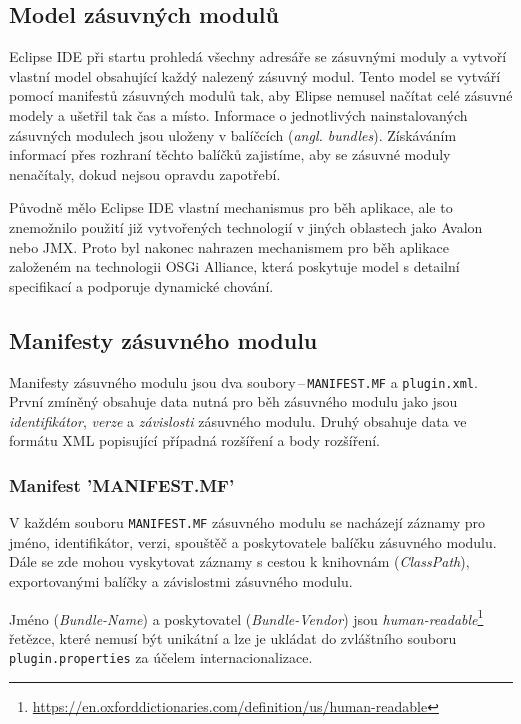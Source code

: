     \subsection{Model zásuvných modulů}
    Eclipse IDE při startu prohledá všechny adresáře se zásuvnými moduly a vytvoří vlastní model obsahující každý nalezený zásuvný modul. Tento model se vytváří pomocí manifestů zásuvných modulů tak, aby Elipse nemusel načítat celé zásuvné modely a ušetřil tak čas a místo. Informace o jednotlivých nainstalovaných zásuvných modulech jsou uloženy v balíčcích (\emph{angl. bundles}). Získáváním informací přes rozhraní těchto balíčků zajistíme, aby se zásuvné moduly nenačítaly, dokud nejsou opravdu zapotřebí.
    
    Původně mělo Eclipse IDE vlastní mechanismus pro běh aplikace, ale to znemožnilo použití již vytvořených technologií v jiných oblastech jako Avalon nebo JMX. Proto byl nakonec nahrazen mechanismem pro běh aplikace založeném na technologii OSGi Alliance, která poskytuje model s detailní specifikací a podporuje dynamické chování.\cite{Plugins}

    \subsection{Manifesty zásuvného modulu}
    Manifesty zásuvného modulu jsou dva soubory\,--\,\texttt{MANIFEST.MF} a \texttt{plugin.xml}. První zmíněný obsahuje data nutná pro běh zásuvného modulu jako jsou \emph{identifikátor}, \emph{verze} a \emph{závislosti} zásuvného modulu. Druhý obsahuje data ve formátu XML popisující případná rozšíření a body rozšíření.

      \subsubsection{Manifest 'MANIFEST.MF'}
      V každém souboru \texttt{MANIFEST.MF} zásuvného modulu se nacházejí záznamy pro jméno, identifikátor, verzi, spouštěč a poskytovatele balíčku zásuvného modulu. Dále se zde mohou vyskytovat záznamy s cestou k knihovnám (\emph{ClassPath}), exportovanými balíčky a závislostmi zásuvného modulu.

      Jméno (\emph{Bundle-Name}) a poskytovatel (\emph{Bundle-Vendor}) jsou \emph{human-readable}\footnote{\url{https://en.oxforddictionaries.com/definition/us/human-readable}} řetězce, které nemusí být unikátní a lze je ukládat do zvláštního souboru \texttt{plugin.properties} za účelem internacionalizace.

